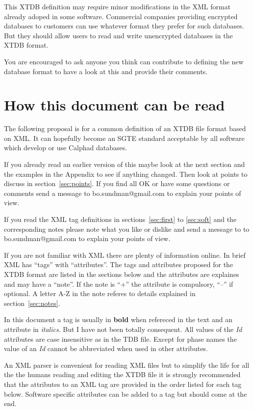 \documentclass{article}
\begin{document}
This XTDB definition may require minor modifications in the XML format
already adoped in some software.  Commercial companies providing
encrypted databases to customers can use whatever format they prefer
for such databases.  But they should allow users to read and write
unencrypted databases in the XTDB format.

You are encouraged to ask anyone you think can contribute to defining
the new database format to have a look at this and provide their
comments.

\newpage

\section{How this document can be read}

The following proposal is for a common definition of an XTDB file
format based on XML.  It can hopefully become an SGTE standard
acceptable by all software which develop or use Calphad databases.

If you already read an earlier version of this maybe look at the next
section and the examples in the Appendix to see if anything changed.
Then look at points to discuss in section~\ref{sec:points}.  If you
find all OK or have some questions or comments send a message to
bo.sundman@gmail.com to explain your points of view.

If you read the XML tag definitions in sections~\ref{sec:first} to
\ref{sec:soft} and the corresponding notes please note what you like
or dislike and send a message to to bo.sundman@gmail.com to explain
your points of view.

If you are not familiar with XML there are plenty of information
online.  In brief XML has ``tags'' with ``attributes''.  The tags and
attributes proposed for the XTDB format are listed in the sections
below and the attributes are explaines and may have a ``note''.  If
the note is ``+'' the attribute is compulsory, ``--'' if optional.  A
letter A-Z in the note referes to details explained in
section~\ref{sec:notes}.

In this document a tag is usually in {\bf bold} when refereced in the
text and an attribute in {\em italics}.  But I have not been totally
consequent.  All values of the {\em Id} attributes are case
insensitive as in the TDB file.  Except for phase names the value of
an {\em Id} cannot be abbreviated when used in other attributes.

An XML parser is convenient for reading XML files but to simplify the
life for all the the humans reading and editing the XTDB file it is
strongly recommended that the attributes to an XML tag are provided in
the order listed for each tag below.  Software specific attributes can
be added to a tag but should come at the end.
\end{document}
